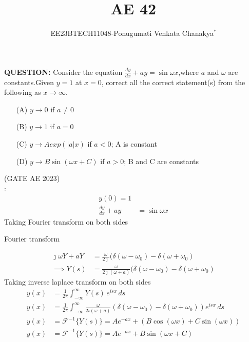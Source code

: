 \documentclass[journal,12pt,twocolumn]{IEEEtran}
\theoremstyle{remark}
\begin{document}
 
 \vspace{3cm}
 \title{\textbf{AE 42}}
 \author{EE23BTECH11048-Ponugumati Venkata Chanakya$^{*}$%
 }
 \maketitle
 \newpage
 \bigskip
 \renewcommand{\thefigure}{\theenumi}
 \renewcommand{\thetable}{\theenumi}
 \textbf{QUESTION:}
Consider the equation $\frac{dy}{dx}+ay=\sin{\omega x}$,where $a$ and $\omega$ are constants.Given $y=1$ at $x=0$, correct all the correct statement(s) from the following as $x\to \infty$.
\begin{enumerate}

  \item[(A)]  $y \to 0$ if $a \neq 0$ \\ 
  \item[(B)]  $y \to 1$ if $a = 0$\\
  \item[(C)]  $y \to Aexp(|a|x)$ if $a < 0$; A is constant\\
  \item[(D)]  $y \to B \sin(\omega x+C)$ if $a>0$; B and C are constants\\
\end{enumerate}
\hfill(GATE AE 2023)\\
\solution: \\
\begin{align}
  y(0)=1\\
 \frac{dy}{dx}+ay &= \sin{\omega x}
\end{align}
 Taking Fourier transform on both sides 
  \begin{table}[!ht]
    \centering
        
    \caption{Fourier transform}
    \label{tab:Gate AE 42 }
\end{table}
\begin{align}
   \jmath \omega Y+aY &= \frac{\omega}{2\jmath}(\delta(\omega-\omega_0)-\delta(\omega+\omega_0)\\
    \implies Y(s)&=\frac{\omega}{2\jmath(\omega+a)}(\delta(\omega-\omega_0)-\delta(\omega+\omega_0)
 \end{align}
 Taking inverse laplace transform on both sides 
 \begin{align}
  y(x) &= \frac{1}{2\pi} \int_{-\infty}^{\infty} Y(s) \, e^{isx} \, ds\\
   y(x) &= \frac{1}{2\pi} \int_{-\infty}^{\infty} \frac{\omega}{2i(\omega + a)} \left( \delta(\omega - \omega_0) - \delta(\omega + \omega_0) \right) e^{isx} \, ds \\
      y(x) &= \mathcal{F}^{-1}\{Y(s)\} = A e^{-ax} + (B\cos(\omega x) + C\sin(\omega x))\\
       y(x) &= \mathcal{F}^{-1}\{Y(s)\} = A e^{-ax} + B\sin(\omega x+C)
 \end{align}
\end{document}
